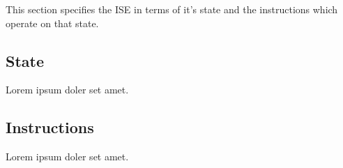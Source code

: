 
This section specifies the ISE in terms of it's state and the instructions
which operate on that state.

\subsection{State}

Lorem ipsum doler set amet.


\subsection{Instructions}

Lorem ipsum doler set amet.

